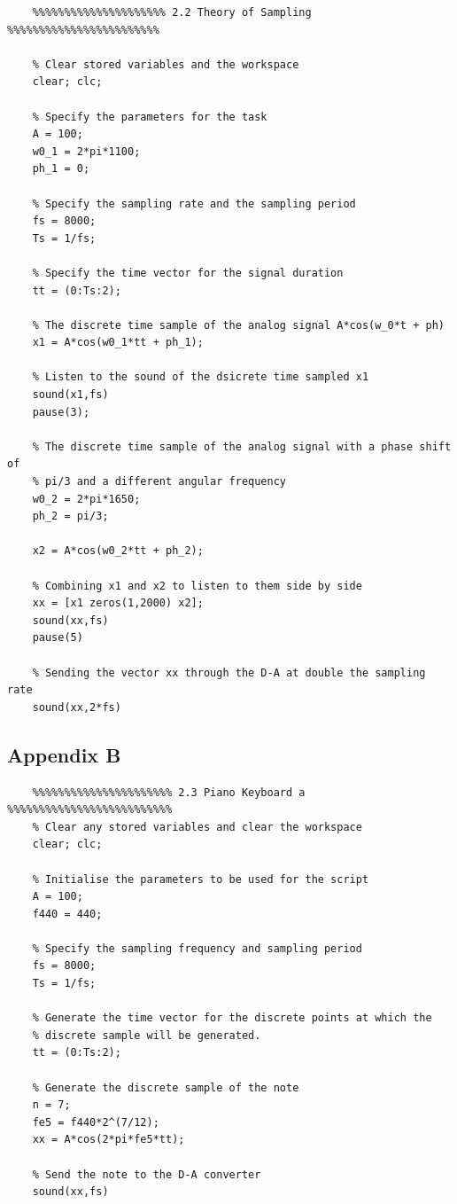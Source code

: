 \documentclass{article}
\begin{document}
\begin{lstlisting}
	%%%%%%%%%%%%%%%%%%%%% 2.2 Theory of Sampling %%%%%%%%%%%%%%%%%%%%%%%%
	
	% Clear stored variables and the workspace
	clear; clc;
	
	% Specify the parameters for the task
	A = 100;
	w0_1 = 2*pi*1100;
	ph_1 = 0;
	
	% Specify the sampling rate and the sampling period
	fs = 8000;
	Ts = 1/fs;
	
	% Specify the time vector for the signal duration
	tt = (0:Ts:2);
	
	% The discrete time sample of the analog signal A*cos(w_0*t + ph)
	x1 = A*cos(w0_1*tt + ph_1);
	
	% Listen to the sound of the dsicrete time sampled x1
	sound(x1,fs)
	pause(3);
	
	% The discrete time sample of the analog signal with a phase shift of
	% pi/3 and a different angular frequency
	w0_2 = 2*pi*1650;
	ph_2 = pi/3;
	
	x2 = A*cos(w0_2*tt + ph_2);
	
	% Combining x1 and x2 to listen to them side by side
	xx = [x1 zeros(1,2000) x2];
	sound(xx,fs)
	pause(5)
	
	% Sending the vector xx through the D-A at double the sampling rate
	sound(xx,2*fs)
\end{lstlisting}

\newpage

\subsection{Appendix B}

\begin{lstlisting}
	%%%%%%%%%%%%%%%%%%%%%% 2.3 Piano Keyboard a %%%%%%%%%%%%%%%%%%%%%%%%%%
	% Clear any stored variables and clear the workspace
	clear; clc;
	
	% Initialise the parameters to be used for the script
	A = 100;
	f440 = 440;
	
	% Specify the sampling frequency and sampling period
	fs = 8000;
	Ts = 1/fs;
	
	% Generate the time vector for the discrete points at which the
	% discrete sample will be generated.
	tt = (0:Ts:2);
	
	% Generate the discrete sample of the note
	n = 7;
	fe5 = f440*2^(7/12);
	xx = A*cos(2*pi*fe5*tt);
	
	% Send the note to the D-A converter
	sound(xx,fs)
\end{lstlisting}
\end{document}
